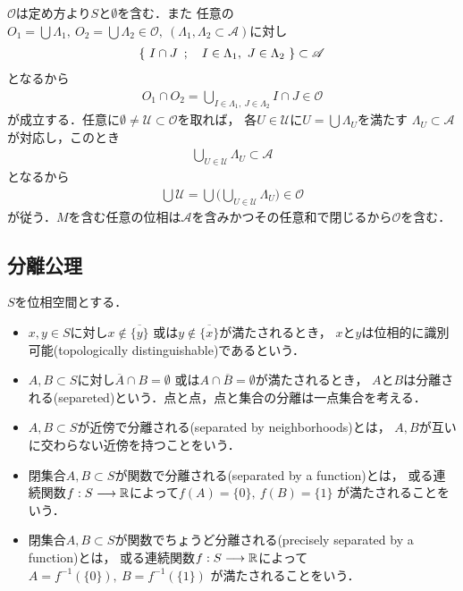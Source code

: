 	\begin{prf}
		$\mathscr{O}$は定め方より$S$と$\emptyset$を含む．また
		任意の$O_1 = \bigcup \Lambda_1,\ O_2=\bigcup \Lambda_2 \in \mathscr{O},\ 
		(\Lambda_1,\Lambda_2 \subset \mathscr{A})$に対し
		\begin{align}
			\left\{\ I \cap J\ \, ; \quad I \in \Lambda_1,\ J \in \Lambda_2\ \right\} \subset \mathscr{A}
		\end{align}
		となるから
		\begin{align}
			O_1 \cap O_2 = \bigcup_{I \in \Lambda_1,\ J \in \Lambda_2} I \cap J \in \mathscr{O}
		\end{align}
		が成立する．任意に$\emptyset \neq \mathscr{U} \subset \mathscr{O}$を取れば，
		各$U \in \mathscr{U}$に$U = \bigcup \Lambda_U$を満たす
		$\Lambda_U \subset \mathscr{A}$が対応し，このとき
		\begin{align}
			\bigcup_{U \in \mathscr{U}} \Lambda_U \subset \mathscr{A}
		\end{align}
		となるから
		\begin{align}
			\bigcup \mathscr{U} = \bigcup \Biggl(\bigcup_{U \in \mathscr{U}} \Lambda_U\Biggr)
			\in \mathscr{O}
		\end{align}
		が従う．$M$を含む任意の位相は$\mathscr{A}$を含みかつその任意和で閉じるから$\mathscr{O}$を含む．
		\QED
	\end{prf}
	
\subsection{分離公理}
	\begin{screen}
		\begin{dfn}[位相的に識別可能・分離]
			$S$を位相空間とする．
			\begin{itemize}
				\item $x,y \in S$に対し$x \notin \overline{\{y\}}$
					或は$y \notin \overline{\{x\}}$が満たされるとき，
					$x$と$y$は位相的に識別可能(topologically distinguishable)であるという．
				\item $A,B \subset S$に対し$\overline{A} \cap B = \emptyset$
					或は$A \cap \overline{B} = \emptyset$が満たされるとき，
					$A$と$B$は分離される(separeted)という．点と点，点と集合の分離は一点集合を考える．
				\item $A,B \subset S$が近傍で分離される(separated by neighborhoods)とは，
					$A,B$が互いに交わらない近傍を持つことをいう．
				\item 閉集合$A,B \subset S$が関数で分離される(separated by a function)とは，
					或る連続関数$f:S\longrightarrow\mathbb{R}$によって$f(A) = \{0\},\ f(B) = \{1\}$
					が満たされることをいう．
				\item 閉集合$A,B \subset S$が関数でちょうど分離される(precisely separated by a function)とは，
					或る連続関数$f:S\longrightarrow\mathbb{R}$によって$A = f^{-1}(\{0\}),\ B = f^{-1}(\{1\})$
					が満たされることをいう．
			\end{itemize}
		\end{dfn}
	\end{screen}
	
